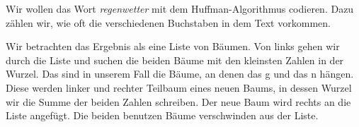 \documentclass{beamer}
\begin{document}
\begin{frame}
Wir wollen das Wort \textit{regenwetter} mit dem Huffman-Algorithmus codieren.  \pause
Dazu zählen wir, wie oft die verschiedenen Buchstaben in dem Text vorkommen.   

Wir betrachten das Ergebnis als eine Liste von Bäumen.  
Von links gehen wir durch die Liste und suchen die beiden Bäume mit den kleinsten Zahlen in der Wurzel.   
Das sind in unserem Fall die Bäume, an denen das g und das n hängen.  Diese werden linker und rechter Teilbaum eines neuen Baums, in dessen Wurzel wir die Summe der beiden Zahlen schreiben.  Der neue Baum wird rechts an die Liste angefügt. Die beiden benutzen Bäume verschwinden aus der Liste.
\\
\end{frame}
\end{document}
